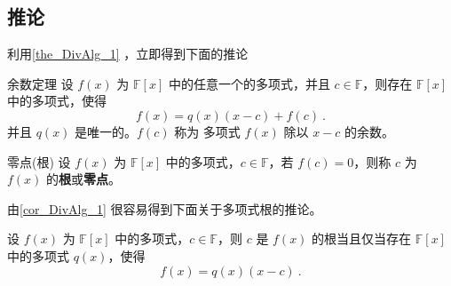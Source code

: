 \subsection{推论}
利用\autoref{the_DivAlg_1} ，立即得到下面的推论
\begin{corollary}{余数定理}\label{cor_DivAlg_1}
设 $f(x)$ 为 $\mathbb{F}[x]$ 中的任意一个的多项式，并且 $c\in\mathbb{F}$，则存在 $\mathbb{F}[x]$ 中的多项式，使得
\begin{equation}
f(x)=q(x)(x-c)+f(c)~.
\end{equation}
并且 $q(x)$ 是唯一的。$f(c)$ 称为 多项式 $f(x)$ 除以 $x-c$ 的余数。
\end{corollary}
\begin{definition}{零点(根)}
设 $f(x)$ 为 $\mathbb{F}[x]$ 中的多项式，$c\in\mathbb{F}$，若 $f(c)=0$，则称 $c$ 为 $f(x)$ 的\textbf{根}或\textbf{零点}。
\end{definition}
由\autoref{cor_DivAlg_1} 很容易得到下面关于多项式根的推论。
\begin{corollary}{}\label{cor_DivAlg_2}
设 $f(x)$ 为 $\mathbb{F}[x]$ 中的多项式，$c\in\mathbb{F}$，则 $c$ 是 $f(x)$ 的根当且仅当存在 $\mathbb{F}[x]$ 中的多项式 $q(x)$，使得
\begin{equation}
f(x)=q(x)(x-c)~.
\end{equation}

\end{corollary}
